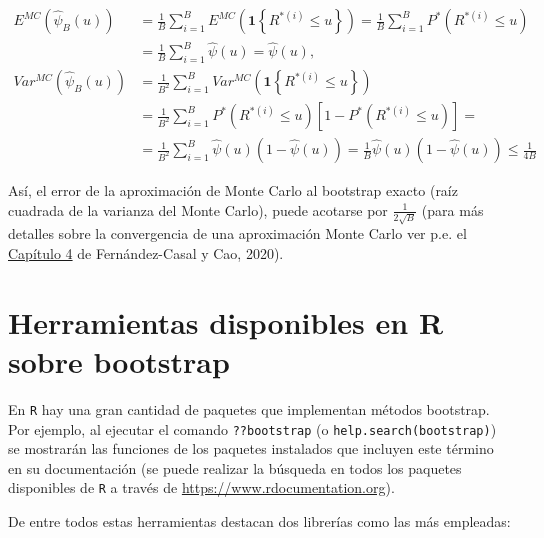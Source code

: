\documentclass[
]{book}
\theoremstyle{break}
\theoremstyle{definition}
\theoremstyle{definition}
\theoremstyle{definition}
\theoremstyle{remark}
\begin{document}
\[\begin{aligned}
E^{MC}\left( \hat{\psi}_{B}\left( u \right) \right) &= \frac{1}{B}
\sum_{i=1}^{B}E^{MC}\left( \mathbf{1}\left\{ R^{\ast (i)}\leq
u\right\} \right) =\frac{1}{B}\sum_{i=1}^{B}P^{\ast}\left( R^{\ast \left(
i \right)}\leq u \right) \\
&= \frac{1}{B}\sum_{i=1}^{B}\hat{\psi}\left( u \right) =\hat{\psi}\left(
u \right), \\
Var^{MC}\left( \hat{\psi}_{B}\left( u \right) \right) &= \frac{1}{B^2}
\sum_{i=1}^{B}Var^{MC}\left( \mathbf{1}\left\{ R^{\ast (i)}\leq
u\right\} \right) \\
&= \frac{1}{B^2}\sum_{i=1}^{B}P^{\ast}\left( R^{\ast (i)
}\leq u \right) \left[ 1-P^{\ast}\left( R^{\ast (i)}\leq
u \right) \right] = \\
&= \frac{1}{B^2}\sum_{i=1}^{B}\hat{\psi}\left( u \right) \left( 1-\hat{\psi}
\left( u \right) \right) =\frac{1}{B}\hat{\psi}\left( u \right) \left( 1-\hat{
\psi}\left( u \right) \right) \leq \frac{1}{4B}
\end{aligned}\]

Así, el error de la aproximación de Monte Carlo al bootstrap exacto
(raíz cuadrada de la varianza del Monte Carlo), puede acotarse por
\(\frac{1}{2\sqrt{B}}\)
(para más detalles sobre la convergencia de una aproximación Monte Carlo ver p.e. el \href{https://rubenfcasal.github.io/simbook/cap4.html}{Capítulo 4} de Fernández-Casal y Cao, 2020).

\hypertarget{intro-paquetes}{%
\section{Herramientas disponibles en R sobre bootstrap}\label{intro-paquetes}}

En \texttt{R} hay una gran cantidad de paquetes que implementan métodos bootstrap.
Por ejemplo, al ejecutar el comando \texttt{??bootstrap} (o \texttt{help.search(\textquotesingle{}bootstrap\textquotesingle{})})
se mostrarán las funciones de los paquetes instalados que incluyen este término
en su documentación (se puede realizar la búsqueda en todos los paquetes disponibles
de \texttt{R} a través de \url{https://www.rdocumentation.org}).

De entre todos estas herramientas destacan dos librerías
como las más empleadas:
\end{document}
